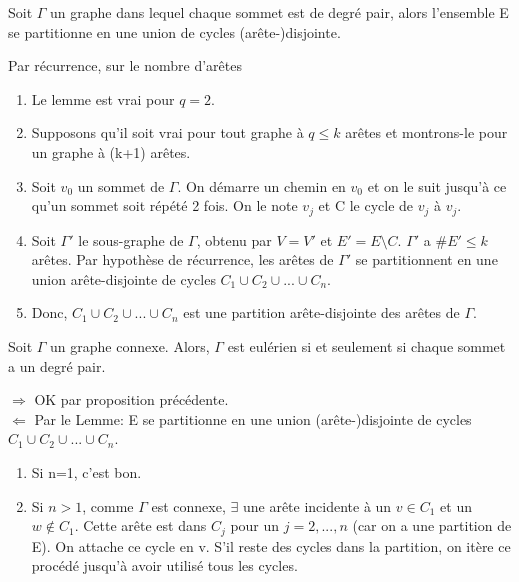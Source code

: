 \begin{lemme}
Soit $\Gamma$ un graphe dans lequel chaque sommet est de degré pair, alors l'ensemble E se partitionne en une union de cycles (arête-)disjointe.\\
\end{lemme}

\begin{exmp}

\end{exmp}


\begin{demo}
Par récurrence, sur le nombre d'arêtes
	\begin{enumerate}
		\item Le lemme est vrai pour $q=2$.
		\item Supposons qu'il soit vrai pour tout graphe à $q \leq k$ arêtes et montrons-le pour un graphe à (k+1) arêtes.
		\item Soit $v_{0}$ un sommet de $\Gamma$. On démarre un chemin en $v_{0}$ et on le suit jusqu'à ce qu'un sommet soit répété 2 fois. On le note $v_{j}$ et C le cycle de $v_{j}$ à $v_{j}$.
		\item Soit ${\Gamma}'$ le sous-graphe de $\Gamma$, obtenu par $V={V}'$ et ${E}'=E \setminus C$. ${\Gamma}'$ a $\#{E}' \leq k$ arêtes. Par hypothèse de récurrence, les arêtes de ${\Gamma}'$ se partitionnent en une union arête-disjointe de cycles $C_{1} \cup C_{2} \cup ... \cup C_{n}$.
		\item Donc, $C_{1} \cup C_{2} \cup ... \cup C_{n}$ est une partition arête-disjointe des arêtes de $\Gamma$.\\
	\end{enumerate}
\end{demo}

\begin{thrm}
Soit $\Gamma$ un graphe connexe. Alors, $\Gamma$ est eulérien si et seulement si chaque sommet a un degré pair.\\
\end{thrm}

\begin{demo}
$\Rightarrow$ OK par proposition précédente.\\
$\Leftarrow$ Par le Lemme: E se partitionne en une union (arête-)disjointe de cycles $C_{1} \cup C_{2} \cup ... \cup C_{n}$.
	\begin{enumerate}
		\item Si n=1, c'est bon.
		\item Si $n>1$, comme $\Gamma$ est connexe, $\exists$ une arête incidente à un $v \in C_{1}$ et un $w \notin C_{1}$. Cette arête est dans $C_{j}$ pour un $j=2,...,n$ (car on a une partition de E). On attache ce cycle en v. S'il reste des cycles dans la partition, on itère ce procédé jusqu'à avoir utilisé tous les cycles.\\
	\end{enumerate}
\end{demo}

